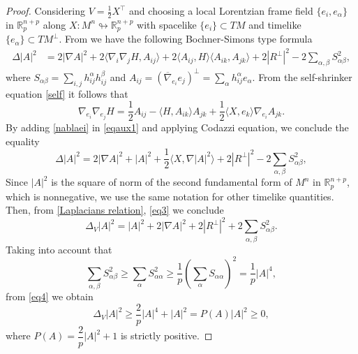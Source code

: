 \documentclass[leqno,11pt]{amsart}
\theoremstyle{plain}
\theoremstyle{definition}
\numberwithin{equation}{section}
\begin{document}
\begin{proof}
Considering $V=\frac{1}{2}X^\top$ and choosing a local Lorentzian frame field $\{e_i,e_\alpha\}$ in $\mathbb R_p^{n+p}$ along $X:M^n\looparrowright\mathbb R^{n+p}_{p}$ with spacelike $\{e_i\}\subset TM$ and timelike $\{e_\alpha\}\subset TM^\perp$. From \cite[Proposition 2.1]{Xin:2011} we have the following Bochner-Simons type formula
\begin{align}\label{eqaux1}
\Delta |A|^2&=2|\nabla A|^2+  2\langle \nabla_i \nabla_j H, A_{ij} \rangle +2\langle A_{ij} , H  \rangle\langle A_{ik},A_{jk}\rangle+2|R^{\perp}|^{2}-2\sum_{\alpha,\beta}S^{2}_{\alpha\beta},
\end{align}
where $S_{\alpha\beta}=\displaystyle\sum_{i,j}h_{ij}^{\alpha}h_{ij}^{\beta}$ and $A_{ij}=\left(\overline{\nabla}_{e_{i}}e_{j}\right)^{\perp}=\displaystyle\sum_{\alpha}h_{ij}^{\alpha}e_{\alpha}$.
From the self-shrinker equation \eqref{self} it follows that
\begin{equation}\label{nablaei}
\nabla_{e_i} \nabla_{e_j} H = \dfrac{1}{2} A_{ij} - \langle H, A_{ik} \rangle A_{jk} + \dfrac{1}{2} \langle X, e_k \rangle \nabla_{e_i} A_{jk}.
\end{equation}
By adding \eqref{nablaei} in \eqref{eqaux1} and applying Codazzi equation, we conclude the equality
\begin{equation}\label{eq3}
\Delta |A|^2=2|\nabla A|^2+  |A|^2 + \dfrac{1}{2} \langle X, \nabla |A|^2 \rangle +2|R^{\perp}|^{2}-2\sum_{\alpha,\beta}S^{2}_{\alpha\beta},
\end{equation}
Since  $|A|^2$ is the square of norm of the second fundamental form of $M^n$ in $\mathbb{R}^{n+p}_p$, which is nonnegative, we use the same notation for other timelike quantities. Then, from \eqref{Laplacians relation}, \eqref{eq3} we conclude
\begin{equation}\label{eq4}
\Delta_V |A|^2 = |A|^2 + 2|\nabla A|^2 + 2|R^\perp|^2 + 2\sum_{\alpha,\beta}S^{2}_{\alpha\beta}.
\end{equation}
Taking into account that
\begin{equation}
\sum_{\alpha,\beta}S^{2}_{\alpha\beta}\geq \sum_{\alpha}S^{2}_{\alpha\alpha}\geq \frac{1}{p}\left(\sum_{\alpha}S_{\alpha\alpha}\right)^{2} = \frac{1}{p}|A|^{4},
\end{equation}
from \eqref{eq4} we obtain
\begin{equation}\label{ineqaux2}
\Delta_V |A|^{2}\geq\frac{2}{p}|A|^{4}+|A|^{2} = P(A)  |A|^2 \geq 0,
\end{equation}
where $P(A) = \dfrac{2}{p}|A|^2 + 1$ is strictly positive.

\end{proof}
\end{document}
